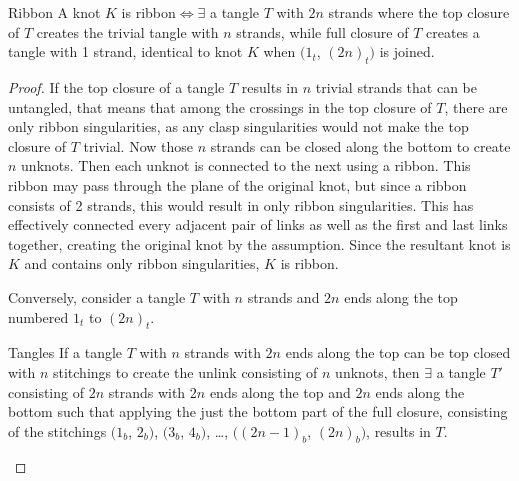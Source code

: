 \begin{paper}
\begin{paperthm}{Ribbon}
A knot $K$ is ribbon$\iff\exists$ a tangle $T$ with $2n$ strands where the
top closure of $T$ creates the trivial tangle with $n$ strands, while
full closure of $T$ creates a tangle with 1 strand, identical to knot $K$ when
$(1_t$, $(2n)_t)$ is joined.
\end{paperthm}
\begin{proof}
If the top closure of a tangle $T$ results in $n$ trivial strands that can be
untangled, that means that among the crossings in the top closure of $T$, there
are only ribbon singularities, as any clasp singularities would not make the top
closure of $T$ trivial.
Now those $n$ strands can be closed along the bottom to create $n$ unknots.
Then each unknot is connected to the next using a ribbon.
This ribbon may pass through the plane of the original knot, but since a ribbon
consists of 2 strands, this would result in only ribbon singularities.
This has effectively connected every adjacent pair of links as well as the first
and last links together, creating the original knot by the assumption.
Since the resultant knot is $K$ and contains only ribbon singularities, $K$ is
ribbon.

Conversely, consider a tangle $T$ with $n$ strands and $2n$ ends along the top
numbered $1_t$ to $(2n)_t$.
\begin{paperlem}{Tangles}
If a tangle $T$ with $n$ strands with $2n$ ends along the top can be top closed
with $n$ stitchings to create the unlink consisting of $n$ unknots, then
$\exists$ a tangle $T'$ consisting of $2n$ strands with $2n$ ends along the top
and $2n$ ends along the bottom such that applying the just the bottom part of
the full closure, consisting of the stitchings $(1_b$, $2_b)$, $(3_b$, $4_b)$,
\dots, $((2n-1)_b$, $(2n)_b)$, results in $T$.



\end{paperlem}
\end{proof}
\end{paper}
